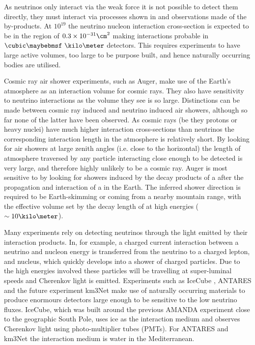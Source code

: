 As neutrinos only interact via the weak force it is not possible to detect them directly, they must interact via processes shown in  and observations made of the by-products. At $10^{19}$ \eV the neutrino nucleon interaction cross-section is expected to be in the region of $0.3 \times 10^{-31} \cm^{2}$  \cite{Gandhi199681} making interactions probable in $\cubic\km$ detectors. This requires experiments to have large active volumes, too large to be purpose built, and hence naturally occurring bodies are utilised.

Cosmic ray air shower experiments, such as Auger, make use of the Earth's atmosphere as an interaction volume for cosmic rays. They also have sensitivity to neutrino interactions as the volume they see is so large. Distinctions can be made between cosmic ray induced and neutrino induced air showers, although so far none of the latter have been observed. As cosmic rays (be they protons or heavy nuclei) have much higher interaction cross-sections than neutrinos the corresponding interaction length in the atmosphere is relatively short. By looking for air showers at large zenith angles (i.e. close to the horizontal) the length of atmosphere traversed by any particle interacting close enough to be detected is very large, and therefore highly unlikely to be a cosmic ray. Auger is most sensitive to \Pnut by looking for showers induced by the decay products of a \Ptau after the propagation and interaction of a \Pnut in the Earth. The inferred shower direction is required to be Earth-skimming or coming from a nearby mountain range, with the effective volume set by the decay length of \Ptau at high energies ($\sim 10 \kilo\meter$).


Many experiments rely on detecting neutrinos through the light emitted by their interaction products. In, for example, a charged current interaction between a neutrino and nucleon energy is transferred from the neutrino to a charged lepton, and nucleus, which quickly develops into a shower of charged particles. Due to the high energies involved these particles will be travelling at super-luminal speeds and Cherenkov light is emitted. Experiments such as IceCube \cite{2010RScI...81h1101H}, ANTARES \cite{2011PhLB..696...16A} and the future experiment km3Net \cite{deJong:2010zza} make use of naturally occurring materials to produce enormours detectors large enough to be sensitive to the low neutrino fluxes. IceCube, which was built around the previous AMANDA \cite{Andres:1999hm} experiment close to the geographic South Pole, uses ice as the interaction medium and observes Cherenkov light using photo-multiplier tubes (PMTs). For ANTARES and km3Net the interaction medium is water in the Mediterranean.

